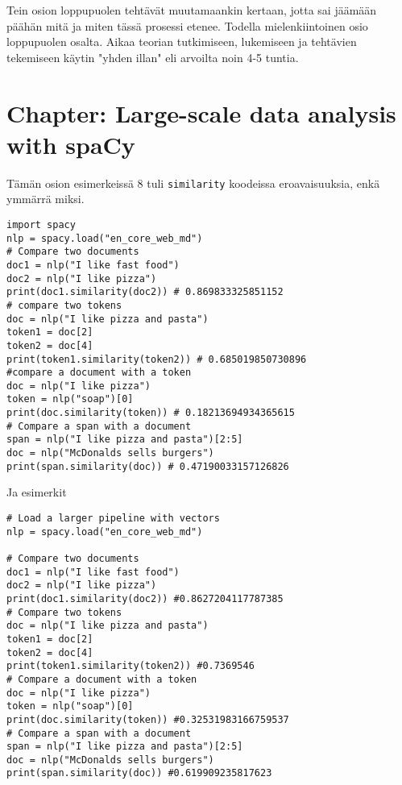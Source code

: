 \documentclass{article}
\begin{document}
Tein osion loppupuolen tehtävät muutamaankin kertaan, jotta sai jäämään päähän mitä ja miten tässä prosessi etenee. Todella mielenkiintoinen osio loppupuolen osalta. Aikaa teorian tutkimiseen, lukemiseen ja tehtävien tekemiseen käytin "yhden illan"  eli arvoilta noin 4-5 tuntia.

\section{Chapter: Large-scale data analysis with spaCy}

Tämän osion esimerkeissä 8 tuli \verb|similarity| koodeissa eroavaisuuksia, enkä ymmärrä miksi.

\begin{lstlisting}
import spacy
nlp = spacy.load("en_core_web_md")
# Compare two documents
doc1 = nlp("I like fast food")
doc2 = nlp("I like pizza")
print(doc1.similarity(doc2)) # 0.869833325851152
# compare two tokens
doc = nlp("I like pizza and pasta")
token1 = doc[2]
token2 = doc[4]
print(token1.similarity(token2)) # 0.685019850730896
#compare a document with a token
doc = nlp("I like pizza")
token = nlp("soap")[0]
print(doc.similarity(token)) # 0.18213694934365615
# Compare a span with a document
span = nlp("I like pizza and pasta")[2:5]
doc = nlp("McDonalds sells burgers")
print(span.similarity(doc)) # 0.47190033157126826
\end{lstlisting}

Ja esimerkit

\begin{lstlisting}
# Load a larger pipeline with vectors
nlp = spacy.load("en_core_web_md")

# Compare two documents
doc1 = nlp("I like fast food")
doc2 = nlp("I like pizza")
print(doc1.similarity(doc2)) #0.8627204117787385
# Compare two tokens
doc = nlp("I like pizza and pasta")
token1 = doc[2]
token2 = doc[4]
print(token1.similarity(token2)) #0.7369546
# Compare a document with a token
doc = nlp("I like pizza")
token = nlp("soap")[0]
print(doc.similarity(token)) #0.32531983166759537
# Compare a span with a document
span = nlp("I like pizza and pasta")[2:5]
doc = nlp("McDonalds sells burgers")
print(span.similarity(doc)) #0.619909235817623
\end{lstlisting}
\end{document}
